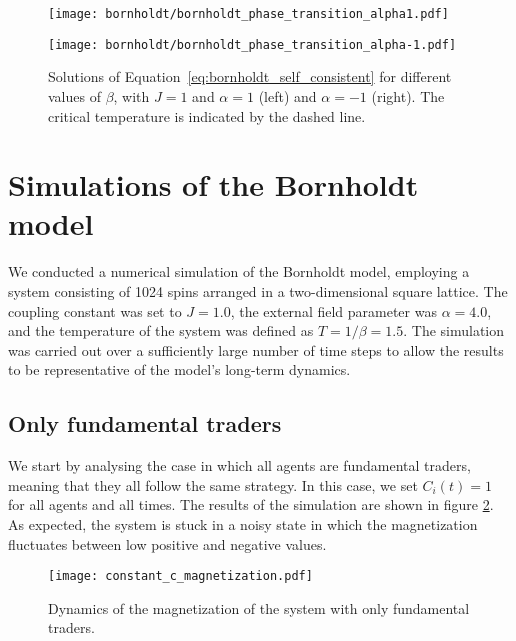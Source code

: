 \begin{figure}[H]
    \centering
    \begin{minipage}[t]{0.45\textwidth}
        \centering
        \texttt{[image: bornholdt/bornholdt\_phase\_transition\_alpha1.pdf]}

    \end{minipage}
    \hfill
    \begin{minipage}[t]{0.45\textwidth}
        \centering
        \texttt{[image: bornholdt/bornholdt\_phase\_transition\_alpha-1.pdf]}
    \end{minipage}
    \caption{Solutions of Equation~\ref{eq:bornholdt_self_consistent} for different values of $\beta$, with $J=1$ and $\alpha=1$ (left) and $\alpha=-1$ (right). The critical temperature is indicated by the dashed line.}
    \label{fig:bornholdt_phase_transition}
\end{figure}


\section{Simulations of the Bornholdt model}
We conducted a numerical simulation of the Bornholdt model, employing a system consisting of 1024 spins arranged in a two-dimensional square lattice. The coupling constant was set to $J=1.0$, the external field parameter was $\alpha=4.0$, and the temperature of the system was defined as $T=1/\beta=1.5$. The simulation was carried out over a sufficiently large number of time steps to allow the results to be representative of the model's long-term dynamics.

\subsection{Only fundamental traders}
We start by analysing the case in which all agents are fundamental traders, meaning that they all follow the same strategy. In this case, we set $C_i(t) = 1$ for all agents and all times. The results of the simulation are shown in figure \ref{fig:fundamental_traders}. As expected, the system is stuck in a noisy state in which the magnetization fluctuates between low positive and negative values.

\begin{figure}[H]
    \centering
    \texttt{[image: constant\_c\_magnetization.pdf]}
    \caption{Dynamics of the magnetization of the system with only fundamental traders.}
    \label{fig:fundamental_traders}
\end{figure}

